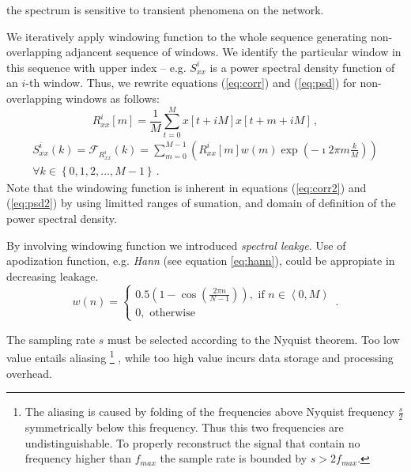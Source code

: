 the spectrum is sensitive 
to transient phenomena on the network. %

We iteratively apply windowing function to the whole sequence generating 
non-overlapping adjancent sequence of windows. 
We identify the particular window in this sequence with upper index -- 
e.g. $S_{xx}^i$ is a power spectral density function of an $i$-th window.
Thus, we rewrite equations (\ref{eq:corr}) and (\ref{eq:psd}) for non-overlapping 
windows as follows:
\begin{equation}\label{eq:corr2}
R_{xx}^i\left[m\right] = \frac{1}{M} \sum_{t=0}^{M} x\left[t+iM\right]x\left[t+m+iM\right] \, , 
\end{equation}
\begin{equation}\label{eq:psd2}
\begin{split}
S_{xx}^i(k) = \mathcal{F}_{R_{xx}^i}\left(k\right) = \sum_{m=0}^{M-1}
\left( R_{xx}^i \left[m\right] w(m) \exp\left( -\imath 2\pi m\frac{k}{M} \right)\right)\\
\forall k \in \left\{ 0,1,2,...,M-1 \right\}\, . 
\end{split}
\end{equation}
Note that the windowing function is inherent in equations (\ref{eq:corr2}) and (\ref{eq:psd2})
by using limitted ranges of sumation, and domain of definition of the power spectral density.

By involving windowing function we introduced
\emph{spectral leakge}. Use of apodization function, e.g. \emph{Hann} %
(see equation \ref{eq:hann}),
could be appropiate in decreasing leakage.
\begin{equation}\label{eq:hann}
w(n) = \left\lbrace \begin{array}{l} 
0.5\left(1 - \cos \left ( \frac{2 \pi n}{N-1} \right) \right), \mbox{ if } n\in \left\langle 
0, M \right) \\ 0, \mbox{ otherwise} \end{array}\right. \,.
\end{equation}

The sampling rate $s$ must be selected according to the Nyquist theorem. 
Too low value entails aliasing%
\footnote{The aliasing is caused by folding of the frequencies above Nyquist frequency
$\frac{s}{2}$ symmetrically below this frequency. Thus this two frequencies are undistinguishable.
To properly reconstruct the signal that contain no frequency higher than $f_{max}$ 
the sample rate is bounded by $s > 2f_{max}$.}%
, while too high value incurs data storage and processing overhead. 

